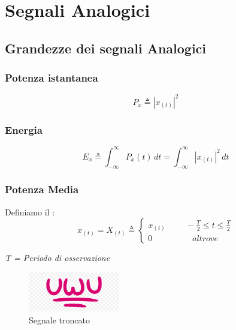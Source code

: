 \section{Segnali Analogici}
    \subsection{Grandezze dei segnali Analogici}
    
        \subsubsection{Potenza istantanea}\label{Potenza istantanea}
            \[
                P_{x} \triangleq |x_{(t)}|^2   
            \]
        \subsubsection{Energia}
            \[
                E_{x} \triangleq \int_{-\infty}^{\infty} P_{x}(t) \,dt = \int_{-\infty}^{\infty} |x_{(t)}|^2 \,dt    
            \]
        \subsubsection{Potenza Media}\label{Potenza media}
            Definiamo il :
                \[
                    x_{(t)} = X_{(t)} \triangleq 
                    \begin{cases}
                        x_{(t)} \hspace{1cm} -\frac{T}{2} \leq t \leq \frac{T}{2} \\
                        0 \hspace{2cm}altrove
                    \end{cases}
                    \]  
                    \begin{center}
                        \em T = Periodo di osservazione
                    \end{center}
                \begin{figure}[h]
                    \centering
                    \includegraphics[width=4cm]{media/uwu.png}
                    \caption{Segnale troncato}
                    \label{fig:troncato}
                \end{figure}
            

